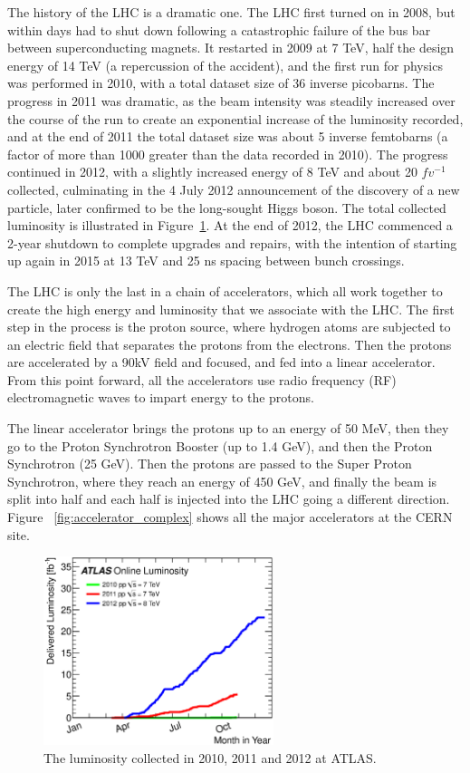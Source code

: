 The history of the LHC is a dramatic one.  The LHC first turned on in 2008, but within days had to shut down following a catastrophic failure of the bus bar between superconducting magnets.  It restarted in 2009 at 7 TeV, half the design energy of 14 TeV (a repercussion of the accident), and the first run for physics was performed in 2010, with a total dataset size of 36 inverse picobarns.  The progress in 2011 was dramatic, as the beam intensity was steadily increased over the course of the run to create an exponential increase of the luminosity recorded, and at the end of 2011 the total dataset size was about 5 inverse femtobarns (a factor of more than 1000 greater than the data recorded in 2010).  The progress continued in 2012, with a slightly increased energy of 8 TeV and about 20 $fv^{-1}$ collected, culminating in the 4 July 2012 announcement of the discovery of a new particle, later confirmed to be the long-sought Higgs boson.  The total collected luminosity is illustrated in Figure~\ref{fig:lumi_vs_year}.  At the end of 2012, the LHC commenced a 2-year shutdown to complete upgrades and repairs, with the intention of starting up again in 2015 at 13 TeV and 25 ns spacing between bunch crossings.


The LHC is only the last in a chain of accelerators, which all work together to create the high energy and luminosity that we associate with the LHC.  The first step in the process is the proton source, where hydrogen atoms are subjected to an electric field that separates the protons from the electrons.  Then the protons are accelerated by a 90kV field and focused, and fed into a linear accelerator.  From this point forward, all the accelerators use radio frequency (RF) electromagnetic waves to impart energy to the protons.  

The linear accelerator brings the protons up to an energy of 50 MeV, then they go to the Proton Synchrotron Booster (up to 1.4 GeV), and then the Proton Synchrotron (25 GeV).  Then the protons are passed to the Super Proton Synchrotron, where they reach an energy of 450 GeV, and finally the beam is split into half and each half is injected into the LHC going a different direction.  Figure ~\ref{fig:accelerator_complex} shows all the major accelerators at the CERN site.


\begin{figure}
	\centering
	\includegraphics[width=0.6\textwidth]{ATLASDetector/images/intlumivsyear.eps}
	\caption{The luminosity collected in 2010, 2011 and 2012 at ATLAS. \label{fig:lumi_vs_year}}
\end{figure}


